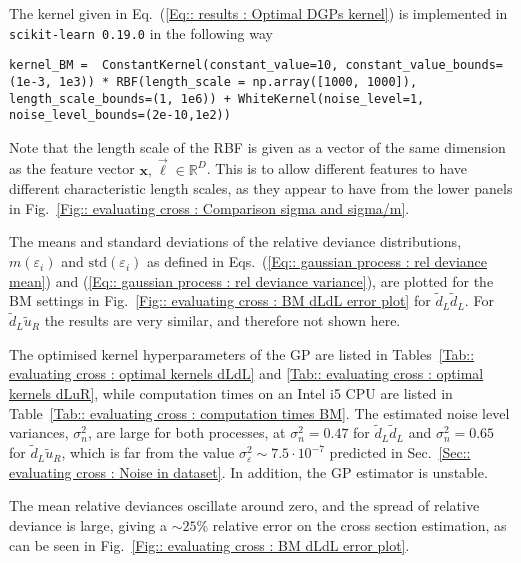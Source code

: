 \documentclass[twoside,english]{uiofysmaster}
\begin{document}
{{  \pagebreak
The kernel given in Eq.~(\ref{Eq:: results : Optimal DGPs kernel}) is implemented in \verb|scikit-learn 0.19.0| in the following way 
\begin{lstlisting}
kernel_BM =  ConstantKernel(constant_value=10, constant_value_bounds=(1e-3, 1e3)) * RBF(length_scale = np.array([1000, 1000]), length_scale_bounds=(1, 1e6)) + WhiteKernel(noise_level=1, noise_level_bounds=(2e-10,1e2))
\end{lstlisting} 
Note that the length scale of the RBF is given as a vector of the same dimension as the feature vector $\textbf{x},\vec{\ell} \in \mathbb{R}^D$. This is to allow different features to have different characteristic length scales, as they appear to have from the lower panels in Fig.~\ref{Fig:: evaluating cross : Comparison sigma and sigma/m}.

The means and standard deviations of the relative deviance distributions, $m(\varepsilon_i)$ and $\text{std}(\varepsilon_i)$ as defined in Eqs.~(\ref{Eq:: gaussian process : rel deviance mean}) and (\ref{Eq:: gaussian process : rel deviance variance}), are plotted for the BM settings in Fig.~\ref{Fig:: evaluating cross : BM dLdL error plot} for $\widetilde{d}_L \widetilde{d}_L$. For $\widetilde{d}_L \widetilde{u}_R$  the results are very similar, and therefore not shown here. 

The optimised kernel hyperparameters of the GP are listed in Tables~\ref{Tab:: evaluating cross : optimal kernels dLdL} and \ref{Tab:: evaluating cross : optimal kernels dLuR}, while computation times on an Intel i5 CPU are listed in Table~\ref{Tab:: evaluating cross : computation times BM}. The estimated noise level variances, $\sigma_n^2$, are large for both processes, at $\sigma_n^2=0.47$ for $\widetilde{d}_L \widetilde{d}_L$ and $\sigma_n^2=0.65$ for $\widetilde{d}_L \widetilde{u}_R$, which is far from the value $\sigma_{\varepsilon}^2 \sim 7.5 \cdot 10^{-7}$ predicted in Sec.~\ref{Sec:: evaluating cross : Noise in dataset}. In addition, the GP estimator is unstable. 

The mean relative deviances oscillate around zero, and the spread of relative deviance is large, giving a $\sim 25 \%$ relative error on the cross section estimation, as can be seen in Fig.~\ref{Fig:: evaluating cross : BM dLdL error plot}.


}}
\end{document}
